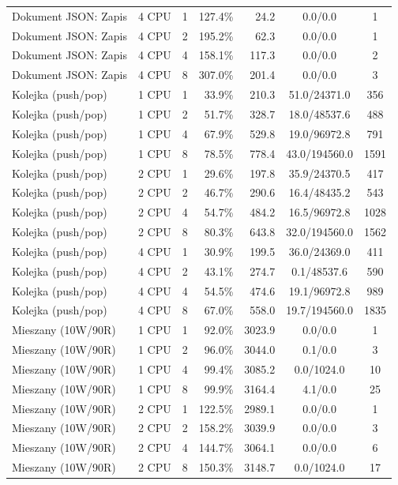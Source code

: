 \begin{table}[ht]
{\begin{tabular}{llcrrcc}
Dokument JSON: Zapis & 4 CPU & 1 & 127.4\% & 24.2 & 0.0/0.0 & 1 \\
Dokument JSON: Zapis & 4 CPU & 2 & 195.2\% & 62.3 & 0.0/0.0 & 1 \\
Dokument JSON: Zapis & 4 CPU & 4 & 158.1\% & 117.3 & 0.0/0.0 & 2 \\
Dokument JSON: Zapis & 4 CPU & 8 & 307.0\% & 201.4 & 0.0/0.0 & 3 \\
Kolejka (push/pop) & 1 CPU & 1 & 33.9\% & 210.3 & 51.0/24371.0 & 356 \\
Kolejka (push/pop) & 1 CPU & 2 & 51.7\% & 328.7 & 18.0/48537.6 & 488 \\
Kolejka (push/pop) & 1 CPU & 4 & 67.9\% & 529.8 & 19.0/96972.8 & 791 \\
Kolejka (push/pop) & 1 CPU & 8 & 78.5\% & 778.4 & 43.0/194560.0 & 1591 \\
Kolejka (push/pop) & 2 CPU & 1 & 29.6\% & 197.8 & 35.9/24370.5 & 417 \\
Kolejka (push/pop) & 2 CPU & 2 & 46.7\% & 290.6 & 16.4/48435.2 & 543 \\
Kolejka (push/pop) & 2 CPU & 4 & 54.7\% & 484.2 & 16.5/96972.8 & 1028 \\
Kolejka (push/pop) & 2 CPU & 8 & 80.3\% & 643.8 & 32.0/194560.0 & 1562 \\
Kolejka (push/pop) & 4 CPU & 1 & 30.9\% & 199.5 & 36.0/24369.0 & 411 \\
Kolejka (push/pop) & 4 CPU & 2 & 43.1\% & 274.7 & 0.1/48537.6 & 590 \\
Kolejka (push/pop) & 4 CPU & 4 & 54.5\% & 474.6 & 19.1/96972.8 & 989 \\
Kolejka (push/pop) & 4 CPU & 8 & 67.0\% & 558.0 & 19.7/194560.0 & 1835 \\
Mieszany (10W/90R) & 1 CPU & 1 & 92.0\% & 3023.9 & 0.0/0.0 & 1 \\
Mieszany (10W/90R) & 1 CPU & 2 & 96.0\% & 3044.0 & 0.1/0.0 & 3 \\
Mieszany (10W/90R) & 1 CPU & 4 & 99.4\% & 3085.2 & 0.0/1024.0 & 10 \\
Mieszany (10W/90R) & 1 CPU & 8 & 99.9\% & 3164.4 & 4.1/0.0 & 25 \\
Mieszany (10W/90R) & 2 CPU & 1 & 122.5\% & 2989.1 & 0.0/0.0 & 1 \\
Mieszany (10W/90R) & 2 CPU & 2 & 158.2\% & 3039.9 & 0.0/0.0 & 3 \\
Mieszany (10W/90R) & 2 CPU & 4 & 144.7\% & 3064.1 & 0.0/0.0 & 6 \\
Mieszany (10W/90R) & 2 CPU & 8 & 150.3\% & 3148.7 & 0.0/1024.0 & 17 \\

\end{tabular}}
\end{table}
